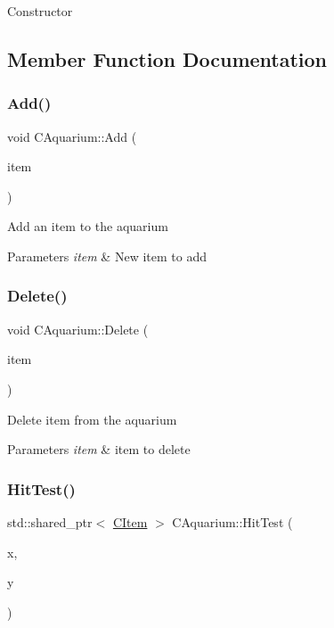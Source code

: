 Constructor 

\subsection{Member Function Documentation}
\mbox{\label{class_c_aquarium_a7c37a9229ac213d1c2bf2eb2d6486722}} 
\subsubsection{\texorpdfstring{Add()}{Add()}}
{\footnotesize\ttfamily void C\+Aquarium\+::\+Add (\begin{DoxyParamCaption}\item[{shared\+\_\+ptr$<$ \mbox{\hyperlink{class_c_item}{C\+Item}} $>$}]{item }\end{DoxyParamCaption})}

Add an item to the aquarium 
\begin{DoxyParams}{Parameters}
{\em item} & New item to add \\
\hline
\end{DoxyParams}
\mbox{\label{class_c_aquarium_a22fc95040d9f538917345d9e89719cc6}} 
\subsubsection{\texorpdfstring{Delete()}{Delete()}}
{\footnotesize\ttfamily void C\+Aquarium\+::\+Delete (\begin{DoxyParamCaption}\item[{shared\+\_\+ptr$<$ \mbox{\hyperlink{class_c_item}{C\+Item}} $>$}]{item }\end{DoxyParamCaption})}

Delete item from the aquarium 
\begin{DoxyParams}{Parameters}
{\em item} & item to delete \\
\hline
\end{DoxyParams}
\mbox{\label{class_c_aquarium_a7129486467e76938fbc049723f9187f3}} 
\subsubsection{\texorpdfstring{HitTest()}{HitTest()}}
{\footnotesize\ttfamily std\+::shared\+\_\+ptr$<$ \mbox{\hyperlink{class_c_item}{C\+Item}} $>$ C\+Aquarium\+::\+Hit\+Test (\begin{DoxyParamCaption}\item[{int}]{x,  }\item[{int}]{y }\end{DoxyParamCaption})}

